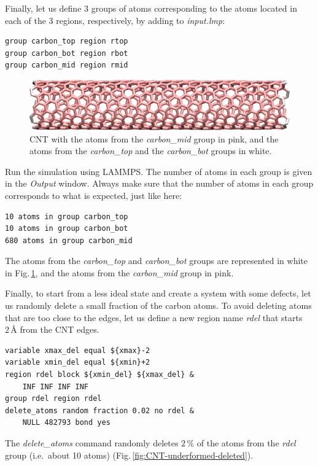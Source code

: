 \documentclass[9pt,tutorial]{livecoms}
\begin{document}
Finally, let us define 3 groups of atoms corresponding to the atoms located
in each of the 3 regions, respectively, by adding to \textit{input.lmp}:
{\normalsize \begin{verbatim}
group carbon_top region rtop
group carbon_bot region rbot
group carbon_mid region rmid
\end{verbatim}}

\begin{figure}
\centering
\includegraphics[width=\linewidth]{CNT-underformed}
\caption{CNT with the atoms from the \textit{carbon\_mid} group in pink,
and the atoms from the \textit{carbon\_top} and the \textit{carbon\_bot}
groups in white.}
\label{fig:CNT-underformed}
\end{figure}

Run the simulation using LAMMPS. The number of atoms in each group is given in
the \textit{Output} window. Always make sure that the number
of atoms in each group corresponds to what is expected, just like here:
{\normalsize \begin{verbatim}
10 atoms in group carbon_top
10 atoms in group carbon_bot
680 atoms in group carbon_mid
\end{verbatim}}
The atoms from the \textit{carbon\_top} and \textit{carbon\_bot} groups are
represented in white in Fig.\,\ref{fig:CNT-underformed}, and the atoms from
the \textit{carbon\_mid} group in pink.

Finally, to start from a less ideal state and create a system with some defects,
let us randomly delete a small fraction of the carbon atoms. To avoid deleting
atoms that are too close to the edges, let us define a new region name \textit{rdel}
that starts $2\,\text{\AA{}}$ from the CNT edges.
{\normalsize \begin{verbatim}
variable xmax_del equal ${xmax}-2
variable xmin_del equal ${xmin}+2
region rdel block ${xmin_del} ${xmax_del} &
    INF INF INF INF
group rdel region rdel
delete_atoms random fraction 0.02 no rdel &
    NULL 482793 bond yes
\end{verbatim}}
The \textit{delete\_atoms} command randomly deletes $2\,\%$ of the atoms from
the \textit{rdel} group (i.e.~about 10 atoms) (Fig.\,\ref{fig:CNT-underformed-deleted}).
\end{document}
